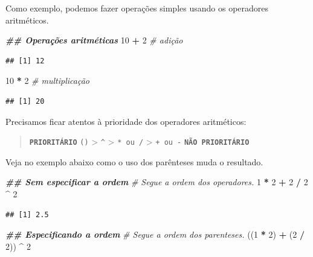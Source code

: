 \documentclass[
]{article}
\newenvironment{Shaded}{\begin{snugshade}}{\end{snugshade}}
\newcommand{\CommentTok}[1]{\textcolor[rgb]{0.56,0.35,0.01}{\textit{#1}}}
\newcommand{\DecValTok}[1]{\textcolor[rgb]{0.00,0.00,0.81}{#1}}
\newcommand{\DocumentationTok}[1]{\textcolor[rgb]{0.56,0.35,0.01}{\textbf{\textit{#1}}}}
\newcommand{\NormalTok}[1]{#1}
\newcommand{\SpecialCharTok}[1]{\textcolor[rgb]{0.81,0.36,0.00}{\textbf{#1}}}
\begin{document}
Como exemplo, podemos fazer operações simples usando os operadores aritméticos.

\begin{Shaded}
\begin{Highlighting}[]
\DocumentationTok{\#\# Operações aritméticas}
\DecValTok{10} \SpecialCharTok{+} \DecValTok{2} \CommentTok{\# adição}
\end{Highlighting}
\end{Shaded}

\begin{verbatim}
## [1] 12
\end{verbatim}

\begin{Shaded}
\begin{Highlighting}[]
\DecValTok{10} \SpecialCharTok{*} \DecValTok{2} \CommentTok{\# multiplicação}
\end{Highlighting}
\end{Shaded}

\begin{verbatim}
## [1] 20
\end{verbatim}

Precisamos ficar atentos à prioridade dos operadores aritméticos:

\begin{quote}
\textbf{\texttt{PRIORITÁRIO}} \texttt{()} \textgreater{} \texttt{\^{}} \textgreater{} \texttt{*\ ou\ /} \textgreater{} \texttt{+\ ou\ -} \textbf{\texttt{NÃO\ PRIORITÁRIO}}
\end{quote}

Veja no exemplo abaixo como o uso dos parênteses muda o resultado.

\begin{Shaded}
\begin{Highlighting}[]
\DocumentationTok{\#\# Sem especificar a ordem}
\CommentTok{\# Segue a ordem dos operadores.}
\DecValTok{1} \SpecialCharTok{*} \DecValTok{2} \SpecialCharTok{+} \DecValTok{2} \SpecialCharTok{/} \DecValTok{2} \SpecialCharTok{\^{}} \DecValTok{2}
\end{Highlighting}
\end{Shaded}

\begin{verbatim}
## [1] 2.5
\end{verbatim}

\begin{Shaded}
\begin{Highlighting}[]
\DocumentationTok{\#\# Especificando a ordem}
\CommentTok{\# Segue a ordem dos parenteses.}
\NormalTok{((}\DecValTok{1} \SpecialCharTok{*} \DecValTok{2}\NormalTok{) }\SpecialCharTok{+}\NormalTok{ (}\DecValTok{2} \SpecialCharTok{/} \DecValTok{2}\NormalTok{)) }\SpecialCharTok{\^{}} \DecValTok{2}
\end{Highlighting}
\end{Shaded}
\end{document}
